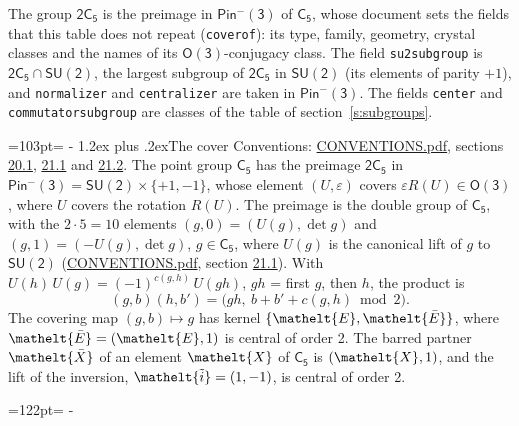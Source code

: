 \documentclass[10pt,a4paper]{article}
\makeatletter
\renewcommand\section{\@startsection{section}{1}{\z@}{-3ex plus -1ex minus -.2ex}%
  {1.2ex plus .2ex}{\normalfont\large\sffamily\bfseries\color{parttitle}}}
\newcommand{\needspace}[1]{\par\penalty-100\begingroup\dimen0=#1\relax\dimen2=\pagegoal
  \advance\dimen2-\pagetotal\ifdim\dimen0>\dimen2\relax\ifdim\dimen2>0pt\vfil\break\fi\fi
  \endgroup}
\numberwithin{equation}{section}
\newcommand{\eltfont}[1]{{\let\sigma\eltsigma\mathelt{#1}}}
\newcommand{\grp}[1]{\mathsf{#1}}
\newcommand{\elt}[1]{\eltfont{#1}}
\newcommand{\dirprod}{\times}
\newcommand{\barred}[1]{\bar{#1}}
\newcommand{\lift}[1]{\tilde{#1}}
\makeatother
\begin{document}
\leavevmode\label{n:element.inversion}\label{n:group.preimage}The group $\grp{2C_{5}}$ is the preimage in $\grp{Pin^{-}(3)}$ of \href{../../../rotation/data/pdf/C5.pdf}{$\grp{C_{5}}$}, whose document sets the fields that this table does not repeat (\texttt{coverof}): its type, family, geometry, crystal classes and the names of its \href{../../../rotation/data/pdf/O3.pdf}{$\grp{O(3)}$}-conjugacy class. The field \texttt{su2subgroup} is $\grp{2C_{5}} \cap \grp{SU(2)}$, the largest subgroup of $\grp{2C_{5}}$ in $\grp{SU(2)}$ (its elements of parity $+1$), and \texttt{normalizer} and \texttt{centralizer} are taken in $\grp{Pin^{-}(3)}$. The fields \texttt{center} and \texttt{commutatorsubgroup} are classes of the table of section~\ref{s:subgroups}.
\needspace{103pt}
\section{The cover}\label{s:cover}
Conventions: \href{../../CONVENTIONS.pdf}{CONVENTIONS.pdf}, sections \href{../../CONVENTIONS.pdf\#conv.20.1}{20.1}, \href{../../CONVENTIONS.pdf\#conv.21.1}{21.1} and \href{../../CONVENTIONS.pdf\#conv.21.2}{21.2}.
\leavevmode\label{n:group.pin.minus}\label{n:group.su2}\label{n:local.pin.sign}\label{n:matrix.covered}\label{n:matrix.lift.su2}\label{n:index.bar}The point group $\grp{C_{5}}$ has the preimage $\grp{2C_{5}}$ in $\grp{Pin^{-}(3)} = \grp{SU(2)} \dirprod \{+1, -1\}$, whose element $(U, \varepsilon)$ covers $\varepsilon R(U) \in \grp{O(3)}$, where $U$ covers the rotation $R(U)$. The preimage is the double group of $\grp{C_{5}}$, with the $2 \cdot 5 = 10$ elements $(g, 0) = (U(g), \det g)$ and $(g, 1) = (-U(g), \det g)$, $g \in \grp{C_{5}}$, where $U(g)$ is the canonical lift of $g$ to $\grp{SU(2)}$ (\href{../../CONVENTIONS.pdf}{CONVENTIONS.pdf}, section \href{../../CONVENTIONS.pdf\#conv.21.1}{21.1}). \label{n:function.cocycle}With $U(h)\,U(g) = (-1)^{c(g,h)}\,U(gh)$, $gh$ = first $g$, then $h$, the product is
\begin{equation}\label{e:product}(g, b)(h, b') = \bigl(gh,\ b + b' + c(g, h) \bmod 2\bigr).\end{equation}
\leavevmode\label{n:mark.bar}The covering map $(g, b) \mapsto g$ has kernel $\{\elt{E}, \elt{\barred{E}}\}$, where $\elt{\barred{E}} = (\elt{E}, 1)$ is central of order 2. \label{n:element.named}\label{n:mark.lift}The barred partner $\elt{\barred{X}}$ of an element $\elt{X}$ of $\grp{C_{5}}$ is $(\elt{X}, 1)$, and the lift of the inversion, $\elt{\lift{i}} = (1, -1)$, is central of order 2.
\needspace{122pt}
\end{document}

